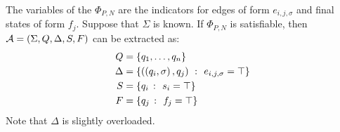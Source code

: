 \documentclass[12pt]{article}
\begin{document}
The variables of the \(\Phi_{P, N}\)
are the indicators for edges of form \(e_{i, j, \sigma}\) and
final states of form \(f_j\).
Suppose that \(\Sigma\) is known.
If \(\Phi_{P, N}\) is satisfiable,
then \(\mathcal{A} = \left(\Sigma, Q, \Delta, S, F\right)\) can be extracted as:
\begin{align*}
  Q &= \left\{q_1, \ldots, q_n\right\} \\
  \Delta &= \left\{\left(\left(q_i, \sigma\right), q_j\right) \ \colon\  e_{i, j, \sigma} = \top\right\} \\
  S &= \left\{q_i \ \colon\  s_i = \top\right\} \\
  F &= \left\{q_j \ \colon\  f_j = \top\right\} \\
\end{align*}
Note that \(\Delta\) is slightly overloaded.
\end{document}
